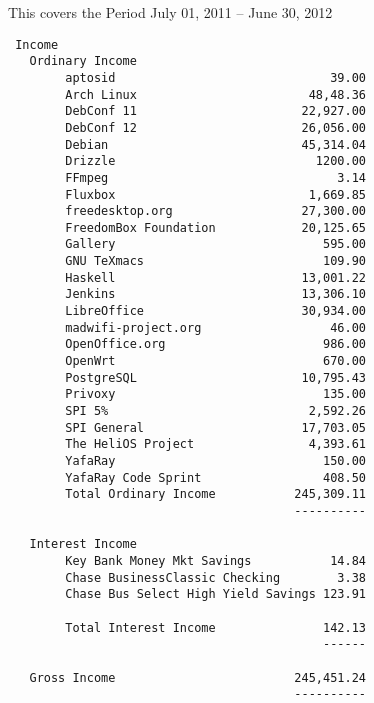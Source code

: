 \documentclass[letterpaper]{report}
\begin{document}
This covers the Period July 01, 2011 -- June 30, 2012

\begin{verbatim}
 Income
   Ordinary Income
        aptosid                              39.00
        Arch Linux                        48,48.36
        DebConf 11                       22,927.00
        DebConf 12                       26,056.00
        Debian                           45,314.04
        Drizzle                            1200.00
        FFmpeg                                3.14
        Fluxbox                           1,669.85
        freedesktop.org                  27,300.00
        FreedomBox Foundation            20,125.65
        Gallery                             595.00
        GNU TeXmacs                         109.90
        Haskell                          13,001.22
        Jenkins                          13,306.10
        LibreOffice                      30,934.00
        madwifi-project.org                  46.00
        OpenOffice.org                      986.00
        OpenWrt                             670.00
        PostgreSQL                       10,795.43
        Privoxy                             135.00
        SPI 5%                            2,592.26
        SPI General                      17,703.05
        The HeliOS Project                4,393.61
        YafaRay                             150.00
        YafaRay Code Sprint                 408.50
        Total Ordinary Income           245,309.11
                                        ----------

   Interest Income
        Key Bank Money Mkt Savings           14.84
        Chase BusinessClassic Checking        3.38
        Chase Bus Select High Yield Savings 123.91

        Total Interest Income               142.13
                                            ------

   Gross Income                         245,451.24
                                        ----------


\end{verbatim}
\end{document}
